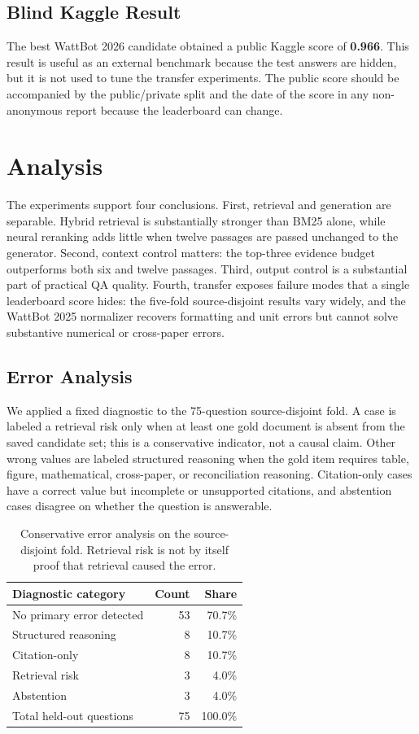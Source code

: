\documentclass[11pt]{article}
\begin{document}
\subsection{Blind Kaggle Result}
The best WattBot 2026 candidate obtained a public Kaggle score of \textbf{0.966}. This result is useful as an external benchmark because the test answers are hidden, but it is not used to tune the transfer experiments. The public score should be accompanied by the public/private split and the date of the score in any non-anonymous report because the leaderboard can change.

\section{Analysis}
\label{sec:analysis}
The experiments support four conclusions. First, retrieval and generation are separable. Hybrid retrieval is substantially stronger than BM25 alone, while neural reranking adds little when twelve passages are passed unchanged to the generator. Second, context control matters: the top-three evidence budget outperforms both six and twelve passages. Third, output control is a substantial part of practical QA quality. Fourth, transfer exposes failure modes that a single leaderboard score hides: the five-fold source-disjoint results vary widely, and the WattBot 2025 normalizer recovers formatting and unit errors but cannot solve substantive numerical or cross-paper errors.

\subsection{Error Analysis}
We applied a fixed diagnostic to the 75-question source-disjoint fold. A case is labeled a retrieval risk only when at least one gold document is absent from the saved candidate set; this is a conservative indicator, not a causal claim. Other wrong values are labeled structured reasoning when the gold item requires table, figure, mathematical, cross-paper, or reconciliation reasoning. Citation-only cases have a correct value but incomplete or unsupported citations, and abstention cases disagree on whether the question is answerable.

\begin{table}[t]
\centering
\small
\begin{tabular}{lrr}
\toprule
Diagnostic category & Count & Share \\
\midrule
No primary error detected & 53 & 70.7\% \\
Structured reasoning & 8 & 10.7\% \\
Citation-only & 8 & 10.7\% \\
Retrieval risk & 3 & 4.0\% \\
Abstention & 3 & 4.0\% \\
\midrule
Total held-out questions & 75 & 100.0\% \\
\bottomrule
\end{tabular}
\caption{Conservative error analysis on the source-disjoint fold. Retrieval risk is not by itself proof that retrieval caused the error.}
\label{tab:error-analysis}
\end{table}
\end{document}
